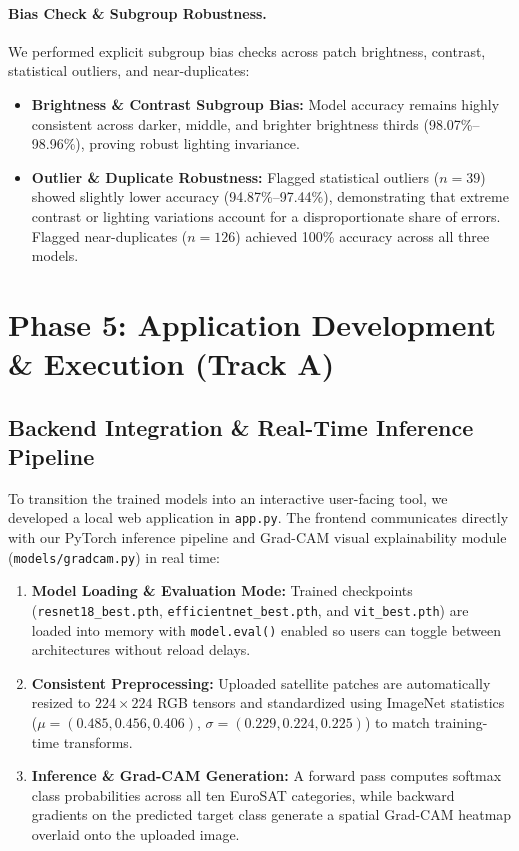 \documentclass[11pt,a4paper]{article}
\begin{document}
\paragraph{Bias Check \& Subgroup Robustness.} We performed explicit subgroup bias checks across patch brightness, contrast, statistical outliers, and near-duplicates:
\begin{itemize}[nosep]
  \item \textbf{Brightness \& Contrast Subgroup Bias:} Model accuracy remains highly consistent across darker, middle, and brighter brightness thirds (98.07\%--98.96\%), proving robust lighting invariance.
  \item \textbf{Outlier \& Duplicate Robustness:} Flagged statistical outliers ($n=39$) showed slightly lower accuracy (94.87\%--97.44\%), demonstrating that extreme contrast or lighting variations account for a disproportionate share of errors. Flagged near-duplicates ($n=126$) achieved 100\% accuracy across all three models.
\end{itemize}

\section{Phase 5: Application Development \& Execution (Track A)}

\subsection{Backend Integration \& Real-Time Inference Pipeline}
To transition the trained models into an interactive user-facing tool, we developed a local web application in \texttt{app.py}. The frontend communicates directly with our PyTorch inference pipeline and Grad-CAM visual explainability module (\texttt{models/gradcam.py}) in real time:
\begin{enumerate}[nosep]
  \item \textbf{Model Loading \& Evaluation Mode:} Trained checkpoints (\texttt{resnet18\_best.pth}, \texttt{efficientnet\_best.pth}, and \texttt{vit\_best.pth}) are loaded into memory with \texttt{model.eval()} enabled so users can toggle between architectures without reload delays.
  \item \textbf{Consistent Preprocessing:} Uploaded satellite patches are automatically resized to $224\times224$ RGB tensors and standardized using ImageNet statistics ($\mu=(0.485,0.456,0.406)$, $\sigma=(0.229,0.224,0.225)$) to match training-time transforms.
  \item \textbf{Inference \& Grad-CAM Generation:} A forward pass computes softmax class probabilities across all ten EuroSAT categories, while backward gradients on the predicted target class generate a spatial Grad-CAM heatmap overlaid onto the uploaded image.
\end{enumerate}
\end{document}
